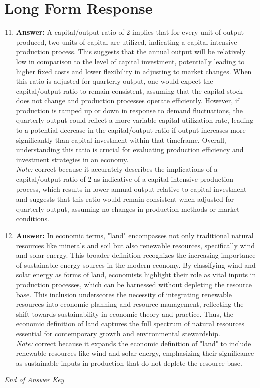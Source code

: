 \documentclass[12pt]{article}
\begin{document}
\section*{Long Form Response}
\begin{enumerate}[label=\arabic*.]
\setcounter{enumi}{10}
\item \textbf{Answer:} A capital/output ratio of 2 implies that for every unit of output produced, two units of capital are utilized, indicating a capital-intensive production process. This suggests that the annual output will be relatively low in comparison to the level of capital investment, potentially leading to higher fixed costs and lower flexibility in adjusting to market changes. When this ratio is adjusted for quarterly output, one would expect the capital/output ratio to remain consistent, assuming that the capital stock does not change and production processes operate efficiently. However, if production is ramped up or down in response to demand fluctuations, the quarterly output could reflect a more variable capital utilization rate, leading to a potential decrease in the capital/output ratio if output increases more significantly than capital investment within that timeframe. Overall, understanding this ratio is crucial for evaluating production efficiency and investment strategies in an economy.
\\ \textit{Note:} correct because it accurately describes the implications of a capital/output ratio of 2 as indicative of a capital-intensive production process, which results in lower annual output relative to capital investment and suggests that this ratio would remain consistent when adjusted for quarterly output, assuming no changes in production methods or market conditions.
\item \textbf{Answer:} In economic terms, "land" encompasses not only traditional natural resources like minerals and soil but also renewable resources, specifically wind and solar energy. This broader definition recognizes the increasing importance of sustainable energy sources in the modern economy. By classifying wind and solar energy as forms of land, economists highlight their role as vital inputs in production processes, which can be harnessed without depleting the resource base. This inclusion underscores the necessity of integrating renewable resources into economic planning and resource management, reflecting the shift towards sustainability in economic theory and practice. Thus, the economic definition of land captures the full spectrum of natural resources essential for contemporary growth and environmental stewardship.
\\ \textit{Note:} correct because it expands the economic definition of "land" to include renewable resources like wind and solar energy, emphasizing their significance as sustainable inputs in production that do not deplete the resource base.
\end{enumerate}

\vfill
\noindent\textit{End of Answer Key}
\end{document}
